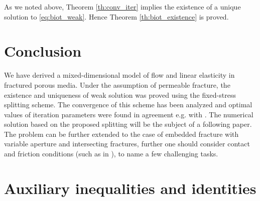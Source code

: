 \documentclass[a4paper]{article}
\numberwithin{equation}{section}
\begin{document}
% 
As we noted above, Theorem \ref{th:conv_iter} implies the existence of a unique solution to \eqref{eq:biot_weak}.
Hence Theorem \ref{th:biot_existence} is proved.



\section*{Conclusion}
We have derived a mixed-dimensional model of flow and linear elasticity in fractured porous media.
Under the assumption of permeable fracture, the existence and uniqueness of weak solution was proved using the fixed-stress splitting scheme.
The convergence of this scheme has been analyzed and optimal values of iteration parameters were found in agreement e.g. with \cite{both2017robust}.
The numerical solution based on the proposed splitting will be the subject of a following paper.
The problem can be further extended to the case of embedded fracture with variable aperture and intersecting fractures, further one should consider contact and friction conditions (such as in \cite{berge2019finite}), to name a few challenging tasks.









\appendix

\section{Auxiliary inequalities and identities}\label{sec:ap_ineq}
\end{document}
